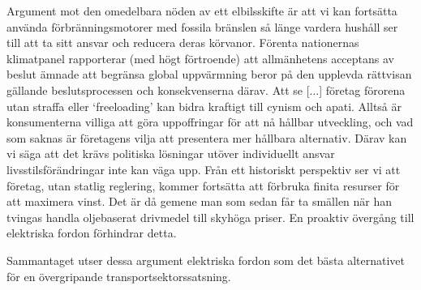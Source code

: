 \documentclass{article}
\begin{document}
Argument mot den omedelbara nöden av ett elbilsskifte är att vi kan
fortsätta använda förbränningsmotorer med fossila bränslen
så länge vardera hushåll ser till att ta sitt ansvar och
reducera deras körvanor.
Förenta nationernas klimatpanel rapporterar \autocite{edenhofer15} (med högt förtroende)
att allmänhetens acceptans av beslut ämnade att begränsa global uppvärmning
beror på den upplevda rättvisan gällande beslutsprocessen och konsekvenserna därav.
Att se [...] företag förorena utan straffa eller `freeloading'
kan bidra kraftigt till cynism och apati.
Alltså är konsumenterna villiga att göra uppoffringar för att nå hållbar utveckling,
och vad som saknas är företagens vilja att presentera mer hållbara alternativ.
Därav kan vi säga att det krävs politiska lösningar utöver individuellt ansvar
livsstilsförändringar inte kan väga upp.
Från ett historiskt perspektiv ser vi att företag, utan statlig reglering,
kommer fortsätta att förbruka finita resurser för att maximera vinst.
Det är då gemene man som sedan får ta smällen när han tvingas handla
oljebaserat drivmedel till skyhöga priser.
En proaktiv övergång till elektriska fordon förhindrar detta.

Sammantaget utser dessa argument elektriska fordon som det bästa alternativet
för en övergripande transportsektorssatsning.

\printbibliography
\end{document}
